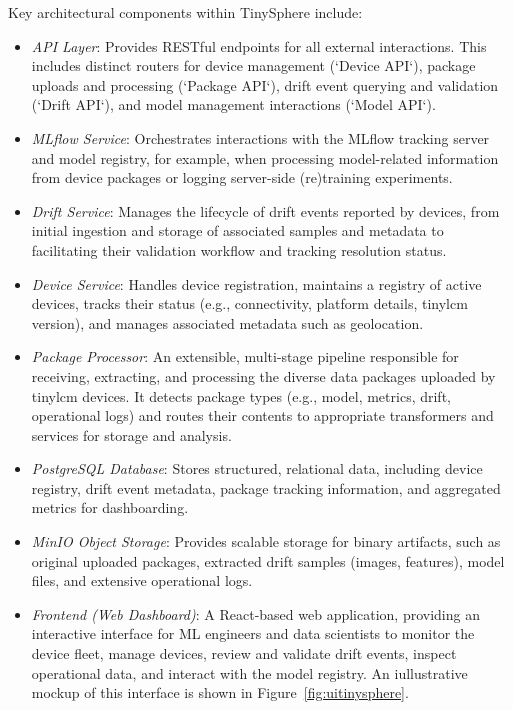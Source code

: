 Key architectural components within TinySphere include:
\begin{itemize}
    \item \textit{API Layer}: Provides RESTful endpoints for all external interactions. This includes distinct routers for device management (`Device API`), package uploads and processing (`Package API`), drift event querying and validation (`Drift API`), and model management interactions (`Model API`).
    \item \textit{MLflow Service}: Orchestrates interactions with the MLflow tracking server and model registry, for example, when processing model-related information from device packages or logging server-side (re)training experiments.
    \item \textit{Drift Service}: Manages the lifecycle of drift events reported by devices, from initial ingestion and storage of associated samples and metadata to facilitating their validation workflow and tracking resolution status.
    \item \textit{Device Service}: Handles device registration, maintains a registry of active devices, tracks their status (e.g., connectivity, platform details, \gls{tinylcm} version), and manages associated metadata such as geolocation.
    \item \textit{Package Processor}: An extensible, multi-stage pipeline responsible for receiving, extracting, and processing the diverse data packages uploaded by \gls{tinylcm} devices. It detects package types (e.g., model, metrics, drift, operational logs) and routes their contents to appropriate transformers and services for storage and analysis.
    \item \textit{PostgreSQL Database}: Stores structured, relational data, including device registry, drift event metadata, package tracking information, and aggregated metrics for dashboarding.
    \item \textit{MinIO Object Storage}: Provides scalable storage for binary artifacts, such as original uploaded packages, extracted drift samples (images, features), model files, and extensive operational logs.
    \item \textit{Frontend (Web Dashboard)}: A React-based web application, providing an interactive interface for ML engineers and data scientists to monitor the device fleet, manage devices, review and validate drift events, inspect operational data, and interact with the model registry. An iullustrative mockup of this interface is shown in Figure~\ref{fig:uitinysphere}.
\end{itemize}

